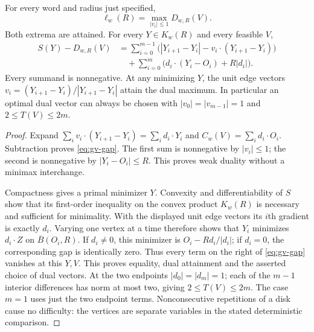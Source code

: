 \begin{theorem}
\label{thm:gv-duality}
For every word and radius just specified,
\begin{equation}\label{eq:gv-duality}
 \ell_w(R)=\max_{|v_i|\le1}D_{w,R}(V).
\end{equation}
Both extrema are attained. For every $Y\in K_w(R)$ and every feasible $V$,
\begin{equation}\label{eq:gv-gap}
 \begin{split}
 S(Y)-D_{w,R}(V)
 &=\sum_{i=0}^{m-1}\bigl(|Y_{i+1}-Y_i|-v_i\cdot(Y_{i+1}-Y_i)\bigr)\\
 &\quad+\sum_{i=0}^m\bigl(d_i\cdot(Y_i-O_i)+R|d_i|\bigr).
 \end{split}
\end{equation}
Every summand is nonnegative. At any minimizing $Y$, the unit edge
vectors $v_i=(Y_{i+1}-Y_i)/|Y_{i+1}-Y_i|$ attain the dual maximum.
In particular an optimal dual vector can always be chosen with
$|v_0|=|v_{m-1}|=1$ and $2\le T(V)\le2m$.
\end{theorem}
\begin{proof}
Expand $\sum_i v_i\cdot(Y_{i+1}-Y_i)=\sum_i d_i\cdot Y_i$ and
$C_w(V)=\sum_i d_i\cdot O_i$. Subtraction proves
\eqref{eq:gv-gap}. The first sum is nonnegative by $|v_i|\le1$;
the second is nonnegative by $|Y_i-O_i|\le R$. This proves weak
duality without a minimax interchange.

Compactness gives a primal minimizer $Y$. Convexity and differentiability
of $S$ show that its first-order inequality on the convex product
$K_w(R)$ is necessary and sufficient for minimality. With the displayed
unit edge vectors its $i$th gradient is exactly $d_i$. Varying one vertex
at a time therefore shows that $Y_i$ minimizes $d_i\cdot Z$ on
$\overline B(O_i,R)$. If $d_i\ne0$, this minimizer is
$O_i-Rd_i/|d_i|$; if $d_i=0$, the corresponding gap is identically
zero. Thus every term on the right of \eqref{eq:gv-gap} vanishes at
this $Y,V$. This proves equality, dual attainment and the asserted
choice of dual vectors. At the two endpoints $|d_0|=|d_m|=1$;
each of the $m-1$ interior differences has norm at most two, giving
$2\le T(V)\le2m$. The case $m=1$ uses just the two endpoint terms.
Nonconsecutive repetitions of a disk cause no difficulty: the vertices
are separate variables in the stated deterministic comparison.
\end{proof}

